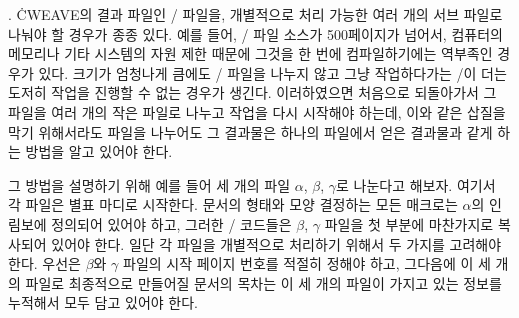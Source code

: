{%
. \.{CWEAVE}의 결과 파일인 \TEX/ 파일을, 개별적으로 처리 가능한 여러 개의 서브
파일로 나눠야 할 경우가 종종 있다. 예를 들어, \TEX/ 파일 소스가 500페이지가 넘어서,
컴퓨터의 메모리나 기타 시스템의 자원 제한 때문에 그것을 한 번에 컴파일하기에는 역부족인 경우가
있다. 크기가 엄청나게 큼에도 \TEX/ 파일을 나누지 않고 그냥 작업하다가는 \TEX/이 더는 도저히
작업을 진행할 수 없는 경우가 생긴다. 이러하였으면 처음으로 되돌아가서 그 파일을 여러 개의
작은 파일로 나누고 작업을 다시 시작해야 하는데, 이와 같은 삽질을 막기 위해서라도 파일을
나누어도 그 결과물은 하나의 파일에서 얻은 결과물과 같게 하는 방법을 알고 있어야 한다.

그 방법을 설명하기 위해 예를 들어 세 개의 파일 $\alpha$, $\beta$, $\gamma$로 나눈다고
해보자. 여기서 각 파일은 별표 마디로 시작한다. 문서의 형태와 모양 결정하는 모든 매크로는
$\alpha$의 인림보에 정의되어 있어야 하고, 그러한 \TEX/ 코드들은 $\beta$, $\gamma$ 파일을
첫 부분에 마찬가지로 복사되어 있어야 한다. 일단 각 파일을 개별적으로 처리하기 위해서 두 가지를
고려해야 한다. 우선은 $\beta$와 $\gamma$ 파일의 시작 페이지 번호를 적절히 정해야 하고,
그다음에 이 세 개의 파일로 최종적으로 만들어질 문서의 목차는 이 세 개의 파일이 가지고 있는
정보를 누적해서 모두 담고 있어야 한다.

}
